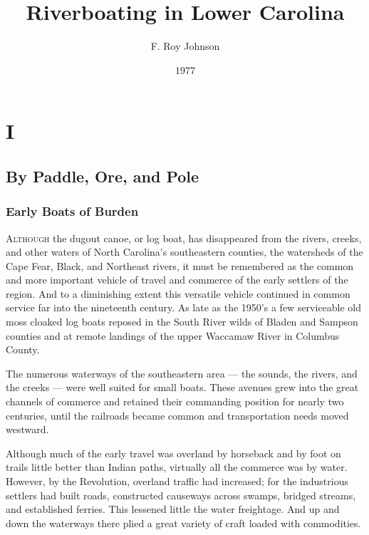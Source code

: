 \documentclass[11pt, a5paper, openright]{book}
\begin{document}
\renewcommand{\thechapter}{\Roman{chapter}}
\title{Riverboating in Lower Carolina}
\author{F. Roy Johnson}
\date{1977}

\maketitle


\part{I}

\chapter{By Paddle, Ore, and Pole}

\section{Early Boats of Burden}

\textsc{Although} the dugout canoe, or log boat, has disappeared from
the rivers, creeks, and other waters of North Carolina's southeastern
counties, the watersheds of the Cape Fear, Black, and Northeast
rivers, it must be remembered as the common and more important vehicle
of travel and commerce of the early settlers of the region.  And to a
diminishing extent this versatile vehicle continued in common service
far into the nineteenth century.  As late as the 1950's a few
serviceable old moss cloaked log boats reposed in the South River
wilds of Bladen and Sampson counties and at remote landings of the
upper Waccamaw River in Columbus County.\par

The numerous waterways of the southeastern area --- the sounds, the
rivers, and the creeks --- were well suited for small boats.  These
avenues grew into the great channels of commerce and retained their
commanding position for nearly two centuries, until the railroads
became common and transportation needs moved westward.\par

Although much of the early travel was overland by horseback and by
foot on trails little better than Indian paths, virtually all the
commerce was by water.  However, by the Revolution, overland traffic
had increased; for the industrious settlers had built roads,
constructed causeways across swamps, bridged streams, and established
ferries.  This lessened little the water freightage.  And up and down
the waterways there plied a great variety of craft loaded with
commodities.\par
\end{document}
